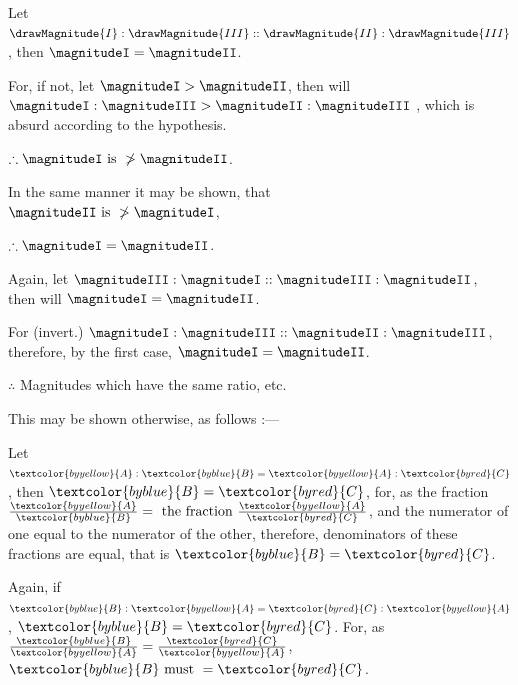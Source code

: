 \documentclass[booklanguage=english]{byrnebook}
\begin{document}
\vfill\pagebreak

\label{prop:V.IX}

\begin{center}
Let $\drawMagnitude{I} : \drawMagnitude{III} :: \drawMagnitude{II} : \drawMagnitude{III}$, then $\magnitudeI = \magnitudeII$.

For, if not, let $\magnitudeI > \magnitudeII$, then will\\
$\magnitudeI : \magnitudeIII > \magnitudeII : \magnitudeIII$ ,
which is absurd according to the hypothesis.

$\therefore \magnitudeI \mbox{ is } \ngtr \magnitudeII$. %

In the same manner it may be shown, that\\
$\magnitudeII \mbox{ is } \ngtr \magnitudeI$, %

$\therefore \magnitudeI = \magnitudeII$.

Again, let $\magnitudeIII : \magnitudeI :: \magnitudeIII : \magnitudeII$,\\
then will $\magnitudeI = \magnitudeII$.

For (invert.) $\magnitudeI : \magnitudeIII :: \magnitudeII : \magnitudeIII$,\\
therefore, by the first case, $\magnitudeI = \magnitudeII$.

$\therefore$ Magnitudes which have the same ratio, etc.
\end{center}

This may be shown otherwise, as follows :—

Let $\textcolor{byyellow}{A} : \textcolor{byblue}{B} = \textcolor{byyellow}{A} : \textcolor{byred}{C}$, then $\textcolor{byblue}{B} = \textcolor{byred}{C}$, for, as the fraction $\frac{\textcolor{byyellow}{A}}{\textcolor{byblue}{B}} = \mbox{ the fraction } \frac{\textcolor{byyellow}{A}}{\textcolor{byred}{C}}$, and the numerator of one equal to the numerator of the other, therefore, denominators of these fractions are equal, that is $\textcolor{byblue}{B} = \textcolor{byred}{C}$.

Again, if $\textcolor{byblue}{B} : \textcolor{byyellow}{A} = \textcolor{byred}{C} : \textcolor{byyellow}{A}$, $\textcolor{byblue}{B} = \textcolor{byred}{C}$. For, as $\frac{\textcolor{byblue}{B}}{\textcolor{byyellow}{A}} = \frac{\textcolor{byred}{C}}{\textcolor{byyellow}{A}}$, $\textcolor{byblue}{B} \mbox{ must } = \textcolor{byred}{C}$.
\end{document}
